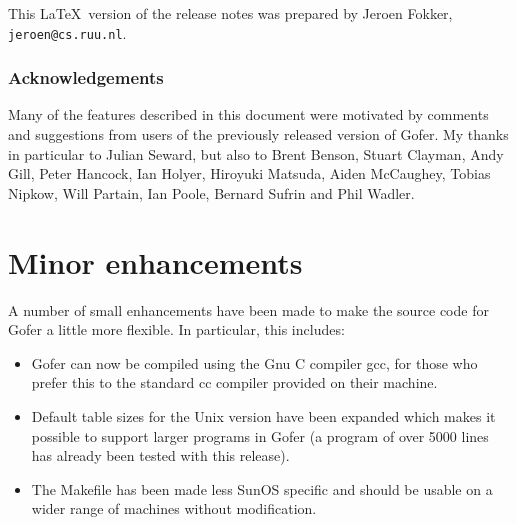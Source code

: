 This \LaTeX\ version of the release notes was prepared
by Jeroen Fokker, \verb"jeroen@cs.ruu.nl".

\subsubsection*{Acknowledgements}
Many of the features described in this document were motivated by
comments and suggestions from users of the previously released version
of Gofer.  My thanks in particular to Julian Seward, but also to Brent
Benson, Stuart Clayman, Andy Gill, Peter Hancock, Ian Holyer, Hiroyuki
Matsuda, Aiden McCaughey, Tobias Nipkow, Will Partain, Ian Poole,
Bernard Sufrin and Phil Wadler.

\newcommand{\I}[1]{\mbox{{\it #1}}}
\newcommand{\TT}[1]{\mbox{{\tt #1}}}
\newcommand{\T}[1]{\fbox{\tt #1}}
\newcommand{\sub}{[}
\newcommand{\bus}{]}

\newcommand{\BQ}{\begin{quote}}
\newcommand{\EQ}{\end{quote}}
\newcommand{\BI}{\begin{itemize}}
\newcommand{\EI}{\end{itemize}}
\newcommand{\BSI}{\begin{simpleitemize}}
\newcommand{\ESI}{\end{simpleitemize}}
\newcommand{\IT}{\item}
\newcommand{\bottom}{\perp}

\newenvironment{simpleitemize}{%
\begin{list}{$\bullet$}{
\parsep  = 0pt
\parskip = 0pt
\topsep  = 0pt
\itemsep = 0pt
}}{\end{list}}



\section{Minor enhancements}

A number of small enhancements have been made to make the source code
for Gofer a little more flexible.  In particular, this includes:
\begin{itemize}
\item  Gofer can now be compiled using the Gnu C compiler gcc, for those
     who prefer this to the standard cc compiler provided on their
     machine.
\item  Default table sizes for the Unix version have been expanded which
     makes it possible to support larger programs in Gofer (a program
     of over 5000 lines has already been tested with this release).
\item  The Makefile has been made less SunOS specific and should be
     usable on a wider range of machines without modification.
\end{itemize}






